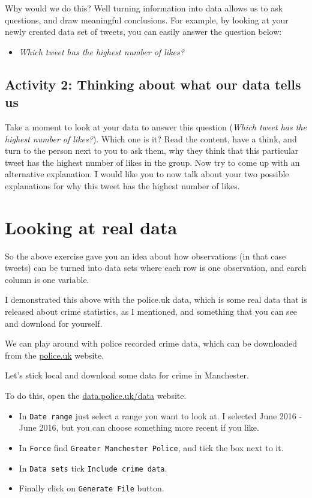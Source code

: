 \documentclass[]{book}
\providecommand{\tightlist}{%
  \setlength{\itemsep}{0pt}\setlength{\parskip}{0pt}}
\theoremstyle{definition}
\theoremstyle{definition}
\theoremstyle{definition}
\theoremstyle{remark}
\begin{document}
Why would we do this? Well turning information into data allows us to
ask questions, and draw meaningful conclusions. For example, by looking
at your newly created data set of tweets, you can easily answer the
question below:

\begin{itemize}
\tightlist
\item
  \emph{Which tweet has the highest number of likes?}
\end{itemize}

\hypertarget{activity-2-thinking-about-what-our-data-tells-us}{%
\subsection{Activity 2: Thinking about what our data tells
us}\label{activity-2-thinking-about-what-our-data-tells-us}}

Take a moment to look at your data to answer this question (\emph{Which
tweet has the highest number of likes?}). Which one is it? Read the
content, have a think, and turn to the person next to you to ask them,
why they think that this particular tweet has the highest number of
likes in the group. Now try to come up with an alternative explanation.
I would like you to now talk about your two possible explanations for
why this tweet has the highest number of likes.

\hypertarget{looking-at-real-data}{%
\section{Looking at real data}\label{looking-at-real-data}}

So the above exercise gave you an idea about how observations (in that
case tweets) can be turned into data sets where each row is one
observation, and earch column is one variable.

I demonstrated this above with the police.uk data, which is some real
data that is released about crime statistics, as I mentioned, and
something that you can see and download for yourself.

We can play around with police recorded crime data, which can be
downloaded from the \href{https://data.police.uk/data/}{police.uk}
website.

Let's stick local and download some data for crime in Manchester.

To do this, open the
\href{https://data.police.uk/data/}{data.police.uk/data} website.

\begin{itemize}
\tightlist
\item
  In \texttt{Date\ range} just select a range you want to look at. I
  selected June 2016 - June 2016, but you can choose something more
  recent if you like.
\item
  In \texttt{Force} find \texttt{Greater\ Manchester\ Police}, and tick
  the box next to it.
\item
  In \texttt{Data\ sets} tick \texttt{Include\ crime\ data}.
\item
  Finally click on \texttt{Generate\ File} button.
\end{itemize}
\end{document}
